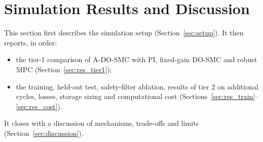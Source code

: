 \section{Simulation Results and Discussion}\label{sec:results}
This section first describes the simulation setup (Section~\ref{sec:setup}). It then reports, in order:
\begin{itemize}
\item the tier-1 comparison of A-DO-SMC with PI, fixed-gain DO-SMC and robust MPC (Section~\ref{sec:res_tier1});
\item the training, held-out test, safety-filter ablation, results of tier 2 on additional cycles, losses, storage sizing and computational cost (Sections~\ref{sec:res_train}--\ref{sec:res_cost}).
\end{itemize}
It closes with a discussion of mechanisms, trade-offs and limits (Section~\ref{sec:discussion}).




